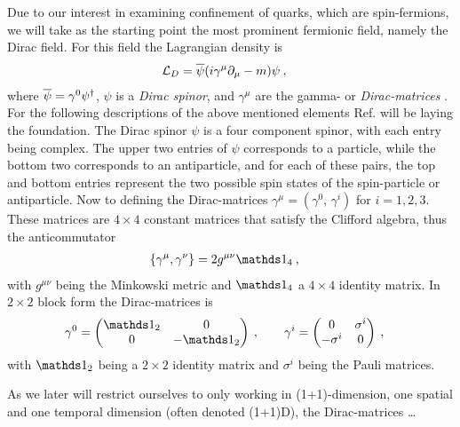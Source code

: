 \documentclass[../main.tex]{subfiles} %
\begin{document}
Due to our interest in examining confinement of quarks, which are spin-\half fermions, we will take as the starting point the most prominent fermionic field, namely the Dirac field. For this field the Lagrangian density is
\begin{align} \label{eq:DiracLagrangiangDensity}
    \mathcal{L}_D &= \overline{\psi} (i \gamma^\mu \partial_\mu - m) \psi \: ,
\end{align}
where $\psibar = \gamma^0 \psi\dagger$, $\psi$ is a \emph{Dirac spinor}, and $\gamma^\mu$ are the gamma- or \emph{Dirac-matrices} \cite{peskin_introToQFT_1995,sakurai_modernQM_2017}. For the following descriptions of the above mentioned elements Ref. \cite{peskin_introToQFT_1995} will be laying the foundation. The Dirac spinor $\psi$ is a four component spinor, with each entry being complex. The upper two entries of $\psi$ corresponds to a particle, while the bottom two corresponds to an antiparticle, and for each of these pairs, the top and bottom entries represent the two possible spin states of the spin-\half particle or antiparticle. Now to defining the Dirac-matrices $\gamma^\mu = (\gamma^0,\, \gamma^i)$ for $i=1,2,3$. These matrices are $4 \times 4$ constant matrices that satisfy the Clifford algebra, thus the anticommutator
\begin{align}
    \anticommutator{\gamma^\mu}{\gamma^\nu} &= 2g^{\mu\nu}\id_4 \: ,
\end{align}
with $g^{\mu\nu}$ being the Minkowski metric and $\id_4$ a $4 \times 4$ identity matrix. In $2 \times 2$ block form the Dirac-matrices is
\begin{align}
    \gamma^0 &=
        \begin{pmatrix}
            \id_2 & 0 \\
            0 & -\id_2
        \end{pmatrix} \: , \qquad
    \gamma^i =
        \begin{pmatrix}
            0 & \sigma^i \\
            -\sigma^i & 0
        \end{pmatrix} \: ,
\end{align}
with $\id_2$ being a $2 \times 2$ identity matrix and $\sigma^i$ being the Pauli matrices.

As we later will restrict ourselves to only working in (1+1)-dimension, one spatial and one temporal dimension (often denoted (1+1)D), the Dirac-matrices \ldots
\end{document}
